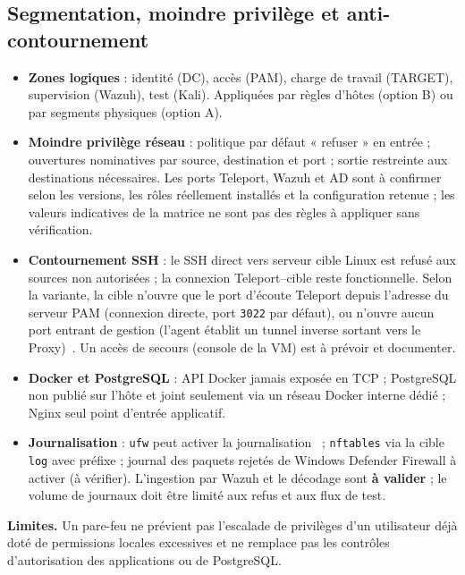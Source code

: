 \documentclass[11pt,a4paper]{report}
\begin{document}
\subsection{Segmentation, moindre privilège et anti-contournement}
\begin{itemize}
\item \textbf{Zones logiques} : identité (DC), accès (PAM), charge de travail (TARGET), supervision (Wazuh), test (Kali). Appliquées par règles d'hôtes (option B) ou par segments physiques (option A).
\item \textbf{Moindre privilège réseau} : politique par défaut « refuser » en entrée ; ouvertures nominatives par source, destination et port ; sortie restreinte aux destinations nécessaires. Les ports Teleport, Wazuh et AD sont à confirmer selon les versions, les rôles réellement installés et la configuration retenue ; les valeurs indicatives de la matrice ne sont pas des règles à appliquer sans vérification.
\item \textbf{Contournement SSH} : le SSH direct vers serveur cible Linux est refusé aux sources non autorisées ; la connexion Teleport--cible reste fonctionnelle. Selon la variante, la cible n'ouvre que le port d'écoute Teleport depuis l'adresse du serveur PAM (connexion directe, port \texttt{3022} par défaut), ou n'ouvre aucun port entrant de gestion (l'agent établit un tunnel inverse sortant vers le Proxy)~\cite{tp-net}. Un accès de secours (console de la VM) est à prévoir et documenter.
\item \textbf{Docker et PostgreSQL} : API Docker jamais exposée en TCP ; PostgreSQL non publié sur l'hôte et joint seulement via un réseau Docker interne dédié ; Nginx seul point d'entrée applicatif.
\item \textbf{Journalisation} : \texttt{ufw} peut activer la journalisation~\cite{ufw-wiki} ; \texttt{nftables} via la cible \texttt{log} avec préfixe ; journal des paquets rejetés de Windows Defender Firewall à activer (à vérifier). L'ingestion par Wazuh et le décodage sont \textbf{à valider} ; le volume de journaux doit être limité aux refus et aux flux de test.
\end{itemize}

\textbf{Limites.} Un pare-feu ne prévient pas l'escalade de privilèges d'un utilisateur déjà doté de permissions locales excessives et ne remplace pas les contrôles d'autorisation des applications ou de PostgreSQL.
\end{document}
